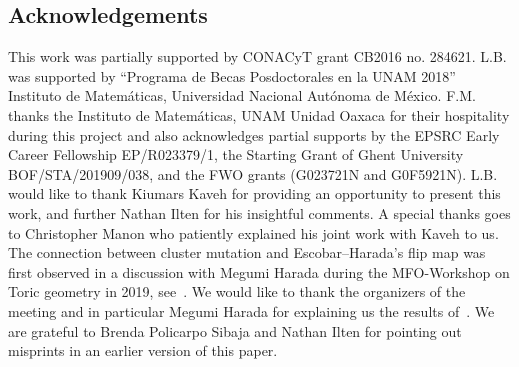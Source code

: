 \documentclass[pdftex]{sigma}%
\numberwithin{equation}{section}
\begin{document}
\subsection*{Acknowledgements}
This work was partially supported by CONACyT grant CB2016 no. 284621.
L.B. was supported by ``Programa de Becas Posdoctorales en la UNAM 2018'' Instituto de Matem\'aticas, Universidad Nacional Aut\'onoma de M\'exico.
F.M. thanks the Instituto de Matem\'aticas, UNAM Unidad Oaxaca for their hospitality during this project and also acknowledges partial supports by the EPSRC Early Career Fellowship EP/R023379/1, the Starting Grant of Ghent University BOF/STA/201909/038, and the FWO grants (G023721N and G0F5921N).
L.B. would like to thank Kiumars Kaveh for providing an opportunity to present this work, and further Nathan Ilten for his insightful comments.
A special thanks goes to Christopher Manon who patiently explained his joint work with Kaveh to us. The connection between cluster mutation and Escobar--Harada's flip map was first observed in a discussion with Megumi Harada during the MFO-Workshop on Toric geometry in 2019, see~\cite{BHM}.
We would like to thank the organizers of the meeting and in particular Megumi Harada for explaining us the results of~\cite{EH-NObodies}.
We are grateful to Brenda Policarpo Sibaja and Nathan Ilten for pointing out misprints in an earlier version of this paper.
\end{document}
